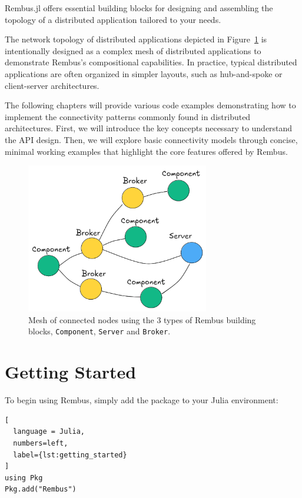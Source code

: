 \documentclass{juliacon}
\begin{document}
Rembus.jl offers essential building blocks for designing and assembling the topology of a
distributed application tailored to your needs.
\vskip 6pt

The network topology of distributed applications depicted in Figure~\ref{fig:mesh}
is intentionally designed as a complex mesh of distributed applications to
demonstrate Rembus's compositional capabilities.
In practice, typical distributed applications are often organized in simpler
layouts, such as hub-and-spoke or client-server architectures.
\vskip 6pt

The following chapters will provide various code examples
demonstrating how to implement the connectivity patterns commonly found in distributed
architectures.
First, we will introduce the key concepts necessary to understand the API design. Then, we
will explore basic connectivity models through concise, minimal working examples that
highlight the core features offered by Rembus.

\begin{figure}[t]
\centerline{\includegraphics[width=8cm]{figures/mesh.png}}
\caption{Mesh of connected nodes using the 3 types of Rembus building blocks,
         \texttt{Component}, \texttt{Server} and \texttt{Broker}.}
    \label{fig:mesh}
\end{figure}

\section{Getting Started}\label{getting-started}

To begin using Rembus, simply add the package to your Julia environment:


\begin{lstlisting}[
  language = Julia, 
  numbers=left, 
  label={lst:getting_started} 
]
using Pkg
Pkg.add("Rembus")
\end{lstlisting}
\end{document}
